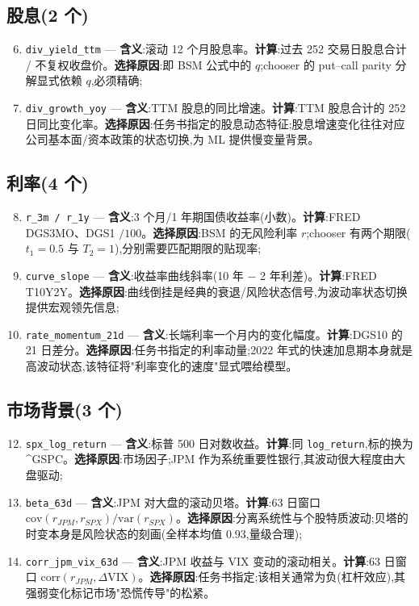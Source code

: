\documentclass[11pt]{ctexart}
\begin{document}
\subsection{股息(2 个)}
\begin{enumerate}
  \setcounter{enumi}{5}
  \item \texttt{div\_yield\_ttm} --- \textbf{含义}:滚动 12 个月股息率。\textbf{计算}:过去 252 交易日股息合计 / 不复权收盘价。\textbf{选择原因}:即 BSM 公式中的 $q$;chooser 的 put--call parity 分解显式依赖 $q$,必须精确;
  \item \texttt{div\_growth\_yoy} --- \textbf{含义}:TTM 股息的同比增速。\textbf{计算}:TTM 股息合计的 252 日同比变化率。\textbf{选择原因}:任务书指定的股息动态特征;股息增速变化往往对应公司基本面/资本政策的状态切换,为 ML 提供慢变量背景。
\end{enumerate}

\subsection{利率(4 个)}
\begin{enumerate}
  \setcounter{enumi}{7}
  \item \texttt{r\_3m / r\_1y} --- \textbf{含义}:3 个月/1 年期国债收益率(小数)。\textbf{计算}:FRED DGS3MO、DGS1 $/100$。\textbf{选择原因}:BSM 的无风险利率 $r$;chooser 有两个期限($t_1=0.5$ 与 $T_2=1$),分别需要匹配期限的贴现率;
  \item \texttt{curve\_slope} --- \textbf{含义}:收益率曲线斜率(10 年 $-$ 2 年利差)。\textbf{计算}:FRED T10Y2Y。\textbf{选择原因}:曲线倒挂是经典的衰退/风险状态信号,为波动率状态切换提供宏观领先信息;
  \item \texttt{rate\_momentum\_21d} --- \textbf{含义}:长端利率一个月内的变化幅度。\textbf{计算}:DGS10 的 21 日差分。\textbf{选择原因}:任务书指定的利率动量;2022 年式的快速加息期本身就是高波动状态,该特征将"利率变化的速度"显式喂给模型。
\end{enumerate}

\subsection{市场背景(3 个)}
\begin{enumerate}
  \setcounter{enumi}{11}
  \item \texttt{spx\_log\_return} --- \textbf{含义}:标普 500 日对数收益。\textbf{计算}:同 \texttt{log\_return},标的换为 \^{}GSPC。\textbf{选择原因}:市场因子;JPM 作为系统重要性银行,其波动很大程度由大盘驱动;
  \item \texttt{beta\_63d} --- \textbf{含义}:JPM 对大盘的滚动贝塔。\textbf{计算}:63 日窗口 $\mathrm{cov}(r_{JPM},r_{SPX})/\mathrm{var}(r_{SPX})$。\textbf{选择原因}:分离系统性与个股特质波动;贝塔的时变本身是风险状态的刻画(全样本均值 0.93,量级合理);
  \item \texttt{corr\_jpm\_vix\_63d} --- \textbf{含义}:JPM 收益与 VIX 变动的滚动相关。\textbf{计算}:63 日窗口 $\mathrm{corr}(r_{JPM},\Delta \mathrm{VIX})$。\textbf{选择原因}:任务书指定;该相关通常为负(杠杆效应),其强弱变化标记市场"恐慌传导"的松紧。
\end{enumerate}
\end{document}
